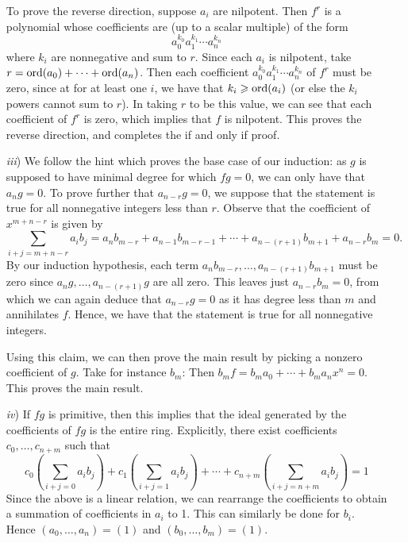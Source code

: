 \documentclass[10pt]{amsart}
\begin{document}
\begin{solution}
\begin{itemize}
        To prove the reverse direction, suppose $a_i$ are nilpotent. Then
        $f^r$ is a polynomial whose coefficients are (up to a scalar multiple)
        of the form 
        \[
            a_0^{k_0}a_1^{k_1}\cdots a_n^{k_n}
        \]
        where $k_i$ are nonnegative and sum to $r$. Since each $a_i$ is nilpotent, take 
        $r = \operatorname{ord}(a_0) + \cdots + \operatorname{ord}(a_n)$. Then each coefficient $a_0^{k_0}a_1^{k_1}\cdots a_n^{k_n}$ 
        of $f^r$ must be zero, since at for at least one $i$, we have that $k_i \geqslant \operatorname{ord}(a_i)$ (or else 
        the $k_i$ powers cannot sum to $r$). In taking $r$ to be this value, we can see 
        that each coefficient of $f^r$ is zero, which implies that $f$ is nilpotent. This proves 
        the reverse direction, and completes the if and only if proof.

        \item[\emph{iii})] We follow the hint which proves the base case of our induction: 
        as $g$ is supposed to have minimal degree for which $fg = 0$, we can only have that 
        $a_ng = 0$. To prove further that $a_{n-r}g = 0$, we suppose that the statement is 
        true for all nonnegative integers less than $r$. Observe that the coefficient of 
        $x^{m+n-r}$ is given by 
        \[
            \sum_{i + j = m+n-r} a_ib_j = a_nb_{m-r} + a_{n-1}b_{m-r-1} 
            + \cdots +
            a_{n-(r+1)}b_{m+1}
            +
            a_{n-r}b_{m}
            =
            0.
        \]
        By our induction hypothesis, each term $a_nb_{m-r}, \dots, a_{n-(r+1)}b_{m+1}$ 
        must be zero since $a_{n}g, \dots, a_{n-(r+1)}g$ are all zero. This leaves 
        just $a_{n-r}b_m = 0$, from which we can again deduce that $a_{n-r}g = 0$ as it has degree less 
        than $m$ and annihilates $f$. Hence, we have that the statement is true for all nonnegative 
        integers. 

        Using this claim, we can then prove the main result by picking a nonzero 
        coefficient of $g$. Take for instance $b_m$: Then $b_mf = b_ma_0 + \cdots + b_ma_nx^n = 0$.
        This proves the main result.

        \item[\emph{iv})]
        If $fg$ is primitive, then this implies that the ideal generated by the coefficients of $fg$ 
        is the entire ring. Explicitly, there exist coefficients $c_0, \dots, c_{n+m}$ 
        such that 
        \[
            c_0\left( \sum_{i + j = 0}a_ib_j \right) 
            +
            c_1\left( \sum_{i + j = 1}a_ib_j \right)  
            + \cdots + 
            c_{n+m}\left( \sum_{i + j = n+m}a_ib_j \right)
            = 1
        \]
        Since the above is a linear relation, we can rearrange the 
        coefficients to obtain a summation of coefficients in $a_i$ to 1. 
        This can similarly be done for $b_i$. Hence $(a_0, \dots, a_n) = (1)$ 
        and $(b_0, \dots, b_{m}) = (1)$.

    \end{itemize}
\end{solution}
\end{document}
